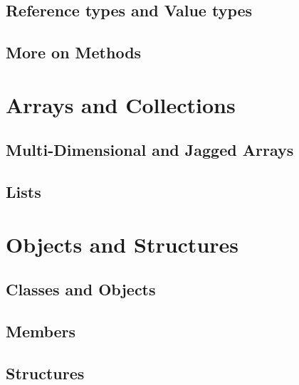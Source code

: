 \documentclass[
]{book}
\begin{document}
\hypertarget{reference-types-and-value-types}{%
\section{Reference types and Value types}\label{reference-types-and-value-types}}

\hypertarget{more-on-methods}{%
\section{More on Methods}\label{more-on-methods}}

\hypertarget{arrays-and-collections}{%
\chapter{Arrays and Collections}\label{arrays-and-collections}}

\hypertarget{multi-dimensional-and-jagged-arrays}{%
\section{Multi-Dimensional and Jagged Arrays}\label{multi-dimensional-and-jagged-arrays}}

\hypertarget{lists}{%
\section{Lists}\label{lists}}

\hypertarget{objects-and-structures}{%
\chapter{Objects and Structures}\label{objects-and-structures}}

\hypertarget{classes-and-objects}{%
\section{Classes and Objects}\label{classes-and-objects}}

\hypertarget{members}{%
\section{Members}\label{members}}

\hypertarget{structures}{%
\section{Structures}\label{structures}}
\end{document}
